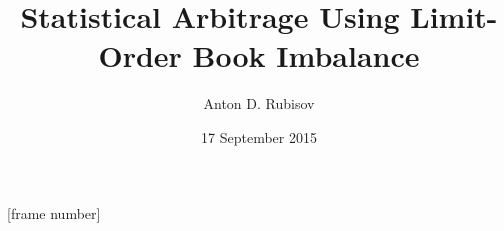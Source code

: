 \title[Arbitrage with Order Imbalance]{Statistical Arbitrage Using Limit-Order Book Imbalance}
\author{Anton D. Rubisov}
\date{17 September 2015}
\beamertemplatenavigationsymbolsempty
{}
[frame number]

\usepackage{booktabs}
\usepackage{adjustbox}
\usepackage{subfig}
\usepackage{bm} 			%
\usepackage{dsfont} 		%
\usepackage{multirow}
\usepackage{graphicx}

\DeclareMathOperator{\sgn}{\mathrm{sgn}}
\renewcommand{\d}{\ensuremath{\,\mathrm{d}}}
\renewcommand{\P}{\mathbb{P}}
\newcommand{\R}{\mathbb{R}}
\newcommand{\E}{\mathbb{E}}
\newcommand{\bP}{\bm{P}}
\newcommand{\bZ}{\bm{Z}}
\newcommand{\bj}{\bm{j}}
\newcommand{\bu}{\bm{u}}
\newcommand{\bw}{\bm{w}}
\newcommand{\bx}{\bm{x}}
\newcommand{\bz}{\bm{z}}
\newcommand{\btau}{\bm{\tau}}
\newcommand{\cF}{\mathcal{F}}
\newcommand{\cA}{\mathcal{A}}
\newcommand{\cL}{\mathcal{L}}
\newcommand{\indicator}{\mathds{1}}
\newcommand{\mat}[1]{\boldsymbol{#1}}
\newcommand{\ra}[1]{\renewcommand{\arraystretch}{#1}}
\newcommand\simcal[1]{\stackrel{\sim}{\smash{\mathcal{#1}}\rule{0pt}{1.2ex}}}


\newcommand{\cellbreak}[3]{%
  \begin{tabular}[#1]{@{}#2@{}}#3\end{tabular}}